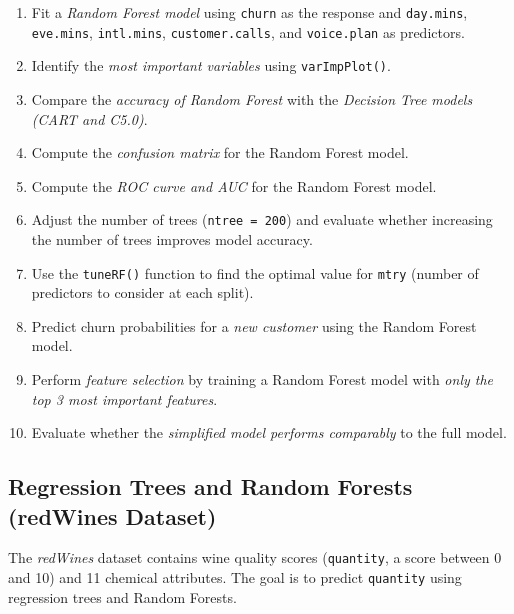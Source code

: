 \documentclass[
  11pt,
]{book}
\providecommand{\tightlist}{%
  \setlength{\itemsep}{0pt}\setlength{\parskip}{0pt}}
\theoremstyle{definition}
\theoremstyle{definition}
\theoremstyle{definition}
\theoremstyle{definition}
\theoremstyle{remark}
\begin{document}
\begin{enumerate}
\def\labelenumi{\arabic{enumi}.}
\setcounter{enumi}{27}
\tightlist
\item
  Fit a \emph{Random Forest model} using \texttt{churn} as the response and \texttt{day.mins}, \texttt{eve.mins}, \texttt{intl.mins}, \texttt{customer.calls}, and \texttt{voice.plan} as predictors.\\
\item
  Identify the \emph{most important variables} using \texttt{varImpPlot()}.\\
\item
  Compare the \emph{accuracy of Random Forest} with the \emph{Decision Tree models (CART and C5.0)}.\\
\item
  Compute the \emph{confusion matrix} for the Random Forest model.\\
\item
  Compute the \emph{ROC curve and AUC} for the Random Forest model.\\
\item
  Adjust the number of trees (\texttt{ntree\ =\ 200}) and evaluate whether increasing the number of trees improves model accuracy.\\
\item
  Use the \texttt{tuneRF()} function to find the optimal value for \texttt{mtry} (number of predictors to consider at each split).\\
\item
  Predict churn probabilities for a \emph{new customer} using the Random Forest model.\\
\item
  Perform \emph{feature selection} by training a Random Forest model with \emph{only the top 3 most important features}.\\
\item
  Evaluate whether the \emph{simplified model performs comparably} to the full model.
\end{enumerate}

\subsection*{Regression Trees and Random Forests (redWines Dataset)}\label{regression-trees-and-random-forests-redwines-dataset}


The \emph{redWines} dataset contains wine quality scores (\texttt{quantity}, a score between 0 and 10) and 11 chemical attributes. The goal is to predict \texttt{quantity} using regression trees and Random Forests.
\end{document}
